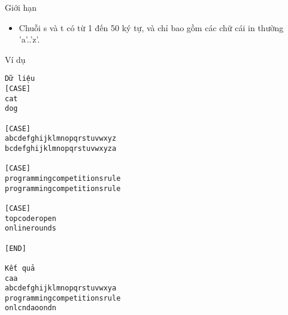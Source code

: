 Giới hạn
\begin{itemize}
	\item     Chuỗi s và t có từ 1 đến 50 ký tự, và chỉ bao gồm các chữ cái in thường 'a'..'z'.   
\end{itemize}
Ví dụ
\begin{verbatim}
Dữ liệu
[CASE]
cat
dog

[CASE]
abcdefghijklmnopqrstuvwxyz
bcdefghijklmnopqrstuvwxyza

[CASE]
programmingcompetitionsrule
programmingcompetitionsrule

[CASE]
topcoderopen
onlinerounds

[END]

Kết quả
caa
abcdefghijklmnopqrstuvwxya
programmingcompetitionsrule
onlcndaoondn
\end{verbatim}